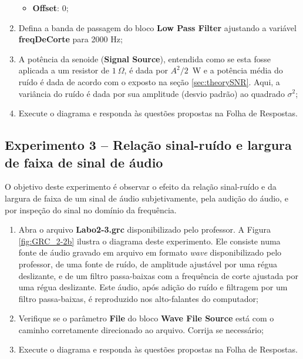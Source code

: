 \documentclass[12pt,addpoints]{exam}
\begin{document}
\begin{enumerate}
\begin{itemize}
        \item \textbf{Offset}: 0;
    \end{itemize}
    \item Defina a banda de passagem do bloco \textbf{Low Pass Filter} ajustando a variável \textbf{freqDeCorte} para 2000 Hz;
    \item A potência da senoide (\textbf{Signal Source}), entendida como se esta fosse aplicada a um resistor de $1~\Omega$, é dada por $A^2/2$~W e a potência média do ruído é dada de acordo com o exposto na seção \ref{sec:theorySNR}. Aqui, a variância do ruído é dada por sua amplitude (desvio padrão) ao quadrado $\sigma^2$;
    \item Execute o diagrama e responda às questões propostas na Folha de Respostas.
\end{enumerate}

\subsection{Experimento 3 -- Relação sinal-ruído e largura de faixa de sinal de áudio}

O objetivo deste experimento é observar o efeito da relação sinal-ruído e da largura de faixa de um sinal de áudio subjetivamente, pela audição do áudio, e por inspeção do sinal no domínio da frequência.

\begin{enumerate}
    \item Abra o arquivo \textbf{Labo2-3.grc} disponibilizado pelo professor. A Figura \ref{fig:GRC_2-2b} ilustra o diagrama deste experimento. Ele consiste numa fonte de áudio gravado em arquivo em formato \textit{wave} disponibilizado pelo professor, de uma fonte de ruído, de amplitude ajustável por uma régua deslizante, e de um filtro passa-baixas com a frequência de corte ajustada por uma régua deslizante. Este áudio, após adição do ruído e filtragem por um filtro passa-baixas, é reproduzido nos alto-falantes do computador;
    \item Verifique se o parâmetro \textbf{File} do bloco \textbf{Wave File Source} está com o caminho corretamente direcionado ao arquivo. Corrija se necessário;
    \item Execute o diagrama e responda às questões propostas na Folha de Respostas.
\end{enumerate}
\end{document}
